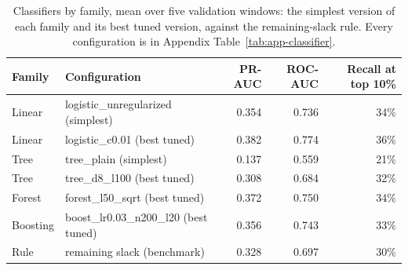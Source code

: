 \begin{table}[ht]
\centering\small
\caption{Classifiers by family, mean over five validation windows: the simplest version of each family and its best tuned version, against the remaining-slack rule. Every configuration is in Appendix Table~\ref{tab:app-classifier}.}
\label{tab:family-summary}
\begin{tabular}{@{}llrrr@{}}
\toprule
Family & Configuration & PR-AUC & ROC-AUC & Recall at top 10\% \\
\midrule
Linear & logistic\_unregularized (simplest) & 0.354 & 0.736 & 34\% \\
Linear & logistic\_c0.01 (best tuned) & 0.382 & 0.774 & 36\% \\
Tree & tree\_plain (simplest) & 0.137 & 0.559 & 21\% \\
Tree & tree\_d8\_l100 (best tuned) & 0.308 & 0.684 & 32\% \\
Forest & forest\_l50\_sqrt (best tuned) & 0.372 & 0.750 & 34\% \\
Boosting & boost\_lr0.03\_n200\_l20 (best tuned) & 0.356 & 0.743 & 33\% \\
Rule & remaining slack (benchmark) & 0.328 & 0.697 & 30\% \\
\bottomrule
\end{tabular}
\end{table}
